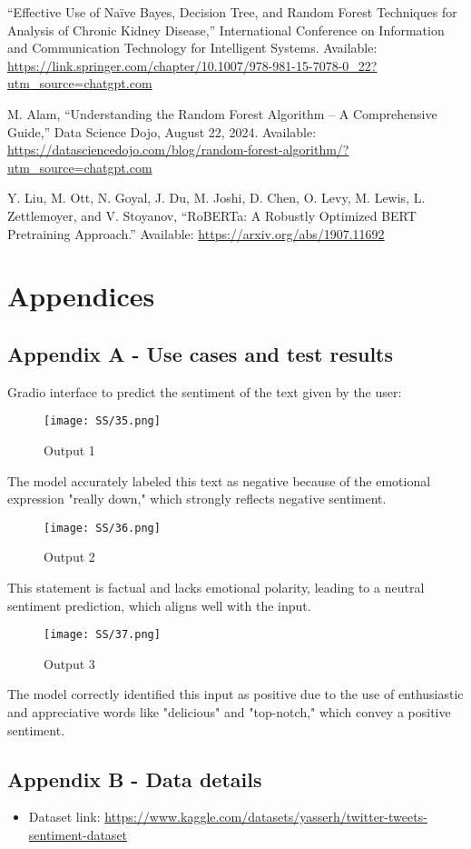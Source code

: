 \documentclass[journal]{IEEEtran}
\begin{document}
\begin{thebibliography}{99}
     ``Effective Use of Naïve Bayes, Decision Tree, and Random Forest Techniques for Analysis of Chronic Kidney Disease,'' International Conference on Information and Communication Technology for Intelligent Systems. Available: \url{https://link.springer.com/chapter/10.1007/978-981-15-7078-0_22?utm_source=chatgpt.com}
    
     M. Alam, ``Understanding the Random Forest Algorithm – A Comprehensive Guide,'' Data Science Dojo, August 22, 2024. Available: \url{https://datasciencedojo.com/blog/random-forest-algorithm/?utm_source=chatgpt.com}
    
     Y. Liu, M. Ott, N. Goyal, J. Du, M. Joshi, D. Chen, O. Levy, M. Lewis, L. Zettlemoyer, and V. Stoyanov, ``RoBERTa: A Robustly Optimized BERT Pretraining Approach.'' Available: \url{https://arxiv.org/abs/1907.11692}
\end{thebibliography}


\section{Appendices}
\subsection{\textbf{Appendix A - Use cases and test results}}
Gradio interface to predict the sentiment of the text given by the user:
\begin{figure}[H]
\centering
\texttt{[image: SS/35.png]}
\caption{Output 1}
\end{figure}
The model accurately labeled this text as negative because of the emotional expression "really down," which strongly reflects negative sentiment.
\begin{figure}[H]
\centering
\texttt{[image: SS/36.png]}
\caption{Output 2}
\end{figure}
This statement is factual and lacks emotional polarity, leading to a neutral sentiment prediction, which aligns well with the input.
\begin{figure}[H]
\centering
\texttt{[image: SS/37.png]}
\caption{Output 3}
\end{figure}
The model correctly identified this input as positive due to the use of enthusiastic and appreciative words like "delicious" and "top-notch," which convey a positive sentiment.

\subsection{\textbf{Appendix B - Data details}}
\begin{itemize}

 \item Dataset link: \href{https://www.kaggle.com/datasets/yasserh/twitter-tweets-sentiment-dataset}{https://www.kaggle.com/datasets/yasserh/twitter-tweets-sentiment-dataset}
\end{itemize}
\end{document}

